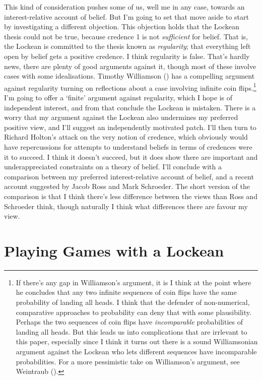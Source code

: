 \documentclass[
  11pt,
  letterpaper,
  DIV=11,
  numbers=noendperiod,
  twoside]{scrartcl}
\begin{document}
This kind of consideration pushes some of us, well me in any case,
towards an interest-relative account of belief. But I'm going to set
that move aside to start by investigating a different objection. This
objection holds that the Lockean thesis could not be true, because
credence 1 is not \emph{sufficient} for belief. That is, the Lockean is
committed to the thesis known as \emph{regularity}; that everything left
open by belief gets a positive credence. I think regularity is false.
That's hardly news, there are plenty of good arguments against it,
though most of these involve cases with some idealisations. Timothy
Williamson () has a
compelling argument against regularity turning on reflections about a
case involving infinite coin flips.\footnote{If there's any gap in
  Williamson's argument, it is I think at the point where he concludes
  that any two infinite sequences of coin flips have the same
  probability of landing all heads. I think that the defender of
  non-numerical, comparative approaches to probability can deny that
  with some plausibility. Perhaps the two sequences of coin flips have
  \emph{incomparable} probabilities of landing all heads. But this leads
  us into complications that are irrlevant to this paper, especially
  since I think it turns out there is a sound Williamsonian argument
  against the Lockean who lets different sequences have incomparable
  probabilities. For a more pessimistic take on Williamson's argument,
  see Weintraub ().} I'm going to
offer a `finite' argument against regularity, which I hope is of
independent interest, and from that conclude the Lockean is mistaken.
There is a worry that my argument against the Lockean also undermines my
preferred positive view, and I'll suggest an independently motivated
patch. I'll then turn to Richard Holton's attack on the very notion of
credence, which obviously would have repercussions for attempts to
understand beliefs in terms of credences were it to succeed. I think it
doesn't succeed, but it does show there are important and
underappreciated constraints on a theory of belief. I'll conclude with a
comparison between my preferred interest-relative account of belief, and
a recent account suggested by Jacob Ross and Mark Schroeder. The short
version of the comparison is that I think there's less difference
between the views than Ross and Schroeder think, though naturally I
think what differences there are favour my view.

\section{Playing Games with a
Lockean}\label{playing-games-with-a-lockean}
\end{document}
